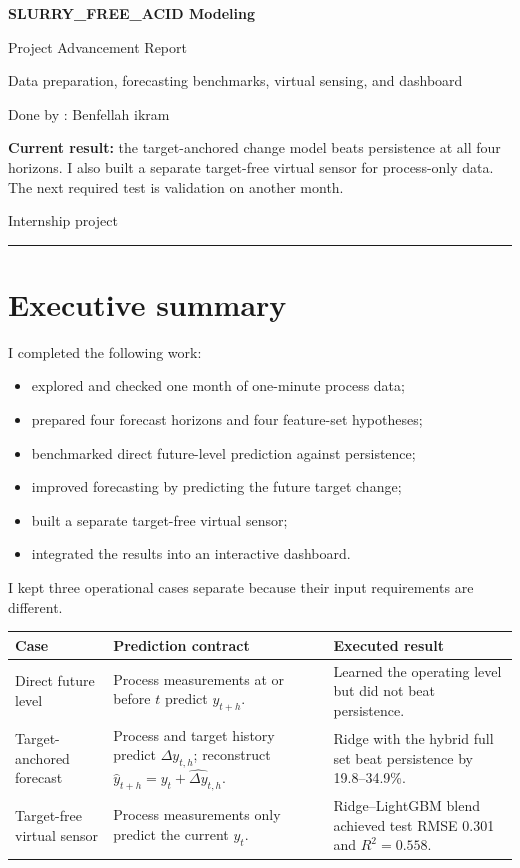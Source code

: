\documentclass[10pt,a4paper]{article}
\newcommand{\statusbox}[1]{\colorbox{Light}{\parbox{0.96\linewidth}{#1}}}
\begin{document}
\begin{titlepage}
  \color{Navy}
  \vspace*{2.4cm}
  {\Huge\bfseries SLURRY\_FREE\_ACID Modeling\par}
  \vspace{0.3cm}
  {\LARGE Project Advancement Report\par}
  \vspace{0.8cm}
  {\large Data preparation, forecasting benchmarks, virtual sensing, and dashboard\par}
  \vspace{0.8cm}
  {\large Done by : Benfellah ikram}
  \vfill
  \statusbox{\textbf{Current result:} the target-anchored change model beats persistence at all four horizons. I also built a separate target-free virtual sensor for process-only data. The next required test is validation on another month.}
  \vfill
 
  {\large Internship project\hfill}
  \vspace{0.3cm}
  \color{Gold}\rule{\textwidth}{4pt}
\end{titlepage}

\section*{Executive summary}

I completed the following work:
\begin{itemize}
  \item explored and checked one month of one-minute process data;
  \item prepared four forecast horizons and four feature-set hypotheses;
  \item benchmarked direct future-level prediction against persistence;
  \item improved forecasting by predicting the future target change;
  \item built a separate target-free virtual sensor;
  \item integrated the results into an interactive dashboard.
\end{itemize}

I kept three operational cases separate because their input requirements are different.

\begin{tabularx}{\textwidth}{L{0.20\textwidth}Y Y}
\toprule
\textbf{Case} & \textbf{Prediction contract} & \textbf{Executed result} \\
\midrule
Direct future level & Process measurements at or before $t$ predict $y_{t+h}$. & Learned the operating level but did not beat persistence. \\
Target-anchored forecast & Process and target history predict $\Delta y_{t,h}$; reconstruct $\hat y_{t+h}=y_t+\widehat{\Delta y}_{t,h}$. & Ridge with the hybrid full set beat persistence by 19.8--34.9\%. \\
Target-free virtual sensor & Process measurements only predict the current $y_t$. & Ridge--LightGBM blend achieved test RMSE 0.301 and $R^2=0.558$. \\
\bottomrule
\end{tabularx}
\end{document}
